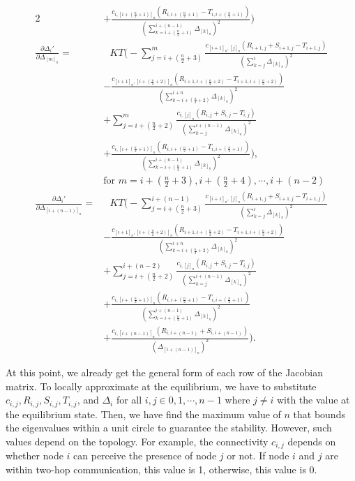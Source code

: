 \begin{alignat}{2}
 &+ \frac{c_{i,[i+(\frac{n}{2}+1)]_n}(R_{i,i+(\frac{n}{2}+1)} - T_{i,i+(\frac{n}{2}+1)})}{(\sum_{k=i+(\frac{n}{2}+1)}^{i+(n-1)}\Delta_{[k]_n})^2} \Bigg) \nonumber \\
\frac{\partial \Delta_i'}{\partial \Delta_{[m]_n}} =& \text{ }KT \Bigg(- \sum_{j= i + (\frac{n}{2}+3)}^{m}  \frac{c_{[i+1]_n,[j]_n}(R_{i+1,j} + S_{i+1,j} - T_{i+1,j})}{(\sum_{k=j}^{i}\Delta_{[k]_n})^2} \nonumber \\
&- \frac{c_{[i+1]_n,[i+(\frac{n}{2}+2)]_n}(R_{i+1,i+(\frac{n}{2}+2)} - T_{i+1,i+(\frac{n}{2}+2)})}{(\sum_{k=i+(\frac{n}{2}+2)}^{i+n}\Delta_{[k]_n})^2} \nonumber \\
&+\sum_{j= i + (\frac{n}{2}+2)}^{m}  \frac{c_{i,[j]_n}(R_{i,j} + S_{i,j} - T_{i,j})}{(\sum_{k=j}^{i+(n-1)}\Delta_{[k]_n})^2} \nonumber \\
&+ \frac{c_{i,[i+(\frac{n}{2}+1)]_n}(R_{i,i+(\frac{n}{2}+1)} - T_{i,i+(\frac{n}{2}+1)})}{(\sum_{k=i+(\frac{n}{2}+1)}^{i+(n-1)}\Delta_{[k]_n})^2}\Bigg), \nonumber \\
&\text{for } m = i+(\frac{n}{2}+3), i+(\frac{n}{2}+4), \cdots, i + (n-2) \nonumber \\
\frac{\partial \Delta_i'}{\partial \Delta_{[i+(n-1)]_n}} =& \text{ }KT \Bigg(- \sum_{j= i + (\frac{n}{2}+ 3)}^{i+(n-1)}  \frac{c_{[i+1]_n,[j]_n}(R_{i+1,j} + S_{i+1,j} - T_{i+1,j})}{(\sum_{k=j}^{i}\Delta_{[k]_n})^2} \nonumber \\
&- \frac{c_{[i+1]_n,[i+(\frac{n}{2}+2)]_n}(R_{i+1,i+(\frac{n}{2}+2)} - T_{i+1,i+(\frac{n}{2}+2)})}{(\sum_{k=i+(\frac{n}{2}+2)}^{i+n}\Delta_{[k]_n})^2} \nonumber \\
&+\sum_{j= i + (\frac{n}{2}+2)}^{i+(n-2)}  \frac{c_{i,[j]_n}(R_{i,j} + S_{i,j} - T_{i,j})}{(\sum_{k=j}^{i+(n-1)}\Delta_{[k]_n})^2} \nonumber \\
&+ \frac{c_{i,[i+(\frac{n}{2}+1)]_n}(R_{i,i+(\frac{n}{2}+1)} - T_{i,i+(\frac{n}{2}+1)})}{(\sum_{k=i+(\frac{n}{2}+1)}^{i+(n-1)}\Delta_{[k]_n})^2} \nonumber \\
 &+ \frac{c_{i,[i+(n-1)]_n}(R_{i,i+(n-1)} + S_{i,i+(n-1)})}{(\Delta_{[i+(n-1)]_n})^2} \Bigg).
\label{eq:jacobiandiff}
\end{alignat}

At this point, we already get the general form of each row of the Jacobian matrix. To locally approximate at the equilibrium, we have to substitute $c_{i,j}, R_{i,j}, S_{i,j}, T_{i,j}$, and $\Delta_i$ for all $i,j \in {0, 1, \cdots, n-1}$ where $j \neq i$ with the value at the equilibrium state. Then, we have find the maximum value of $n$ that bounds the eigenvalues within a unit circle to guarantee the stability. However, such values depend on the topology. For example, the connectivity $c_{i,j}$ depends on whether node $i$ can perceive the presence of node $j$ or not. If node $i$ and $j$ are within two-hop communication, this value is 1, otherwise, this value is 0.

